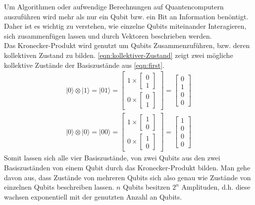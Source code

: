 Um Algorithmen oder aufwendige Berechnungen auf Quantencomputern auszuf\"uhren wird mehr als nur ein Qubit bzw. ein Bit an Information ben\"ontigt. Daher ist es wichtig zu verstehen, wie einzelne Qubits miteinander Interagieren, sich zusammenf\"ugen lassen und durch Vektoren beschrieben werden. \\

Das Kronecker-Produkt wird genutzt um Qubits Zusammenzuf\"uhren, bzw. deren kollektiven Zustand zu bilden. \ref{eqn:kollektiver-Zustand} zeigt zwei m\"ogliche kollektive Zust\"ande der Basiszust\"ande aus \ref{eqn:first}.
\begin{equation}\label{eqn:kollektiver-Zustand}
\begin{aligned}
  |0\rangle\otimes |1\rangle = |01\rangle = \begin{bmatrix}1 \times \begin{bmatrix} 0\\1\end{bmatrix}\\[1em] 0 \times \begin{bmatrix} 0\\1\end{bmatrix}\end{bmatrix} = \begin{bmatrix} 0 \\ 1 \\ 0 \\ 0\end{bmatrix} \\[1em]
  |0\rangle\otimes |0\rangle = |00\rangle = \begin{bmatrix}1 \times \begin{bmatrix} 1\\0\end{bmatrix}\\[1em] 0 \times \begin{bmatrix} 1\\0\end{bmatrix}\end{bmatrix} = \begin{bmatrix} 1 \\ 0 \\ 0 \\ 0\end{bmatrix}
\end{aligned}
\end{equation}
Somit lassen sich alle vier Basiszust\"ande, von zwei Qubits aus den zwei Basiszust\"anden von einem Qubit durch das Kronecker-Produkt bilden.
Man gehe davon aus, dass Zust\"ande von mehreren Qubits sich also genau wie Zust\"ande von einzelnen Qubits beschreiben lassen. $n$ Qubits besitzen $2^n$ Amplituden, d.h. diese wachsen exponentiell mit der genutzten Anzahl an Qubits.

